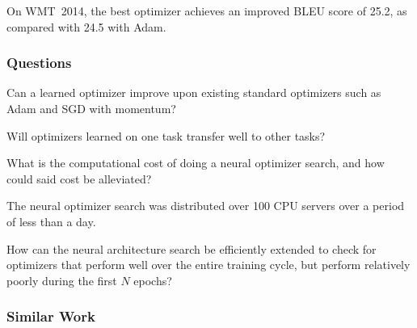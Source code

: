 \documentclass[a4paper, 12pt]{article}
\begin{document}
On WMT~2014, the best optimizer achieves an improved BLEU score of 25.2, as
compared with 24.5 with Adam.

\subsubsection{Questions}

Can a learned optimizer improve upon existing standard optimizers such as Adam
and SGD with momentum?

Will optimizers learned on one task transfer well to other tasks?

What is the computational cost of doing a neural optimizer search, and how
could said cost be alleviated?

The neural optimizer search was distributed over \num{100} CPU servers over a
period of less than a day.

How can the neural architecture search be efficiently extended to check for
optimizers that perform well over the entire training cycle, but perform
relatively poorly during the first $N$ epochs?

\subsubsection{Similar Work}



\end{document}
